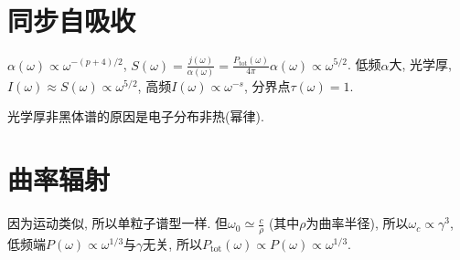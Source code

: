 \section{同步自吸收}

$\alpha(\omega)\propto\omega^{-(p+4)/2}$, $S(\omega)=\frac{j(\omega)}{\alpha(\omega)}=\frac{P_\text{tot}(\omega)}{4\pi}\alpha(\omega)\propto\omega^{5/2}$. 低频$\alpha$大, 光学厚, $I(\omega)\approx S(\omega)\propto\omega^{5/2}$, 高频$I(\omega)\propto\omega^{-s}$, 分界点$\tau(\omega)=1$.

光学厚非黑体谱的原因是电子分布非热(幂律).

\section{曲率辐射}

因为运动类似, 所以单粒子谱型一样. 但$\omega_0\simeq\frac{c}{\rho}$ (其中$\rho$为曲率半径), 所以$\omega_c\propto\gamma^3$, 低频端$P(\omega)\propto\omega^{1/3}$与$\gamma$无关, 所以$P_\text{tot}(\omega)\propto P(\omega)\propto\omega^{1/3}$.
